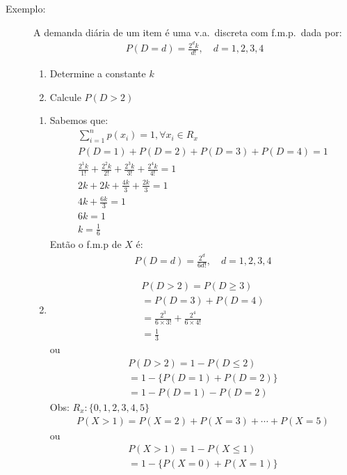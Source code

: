 \begin{description}
     \item [Exemplo:] A demanda diária de um item é uma v.a.\ discreta com f.m.p.\ dada por: 
       \begin{align}
         P(D=d)=\frac{2^d k}{d!},\quad d=1,2,3,4
       \end{align}
       \begin{enumerate}[label=(\alph*)]
         \item Determine a constante $k$
         \item Calcule $P(D>2)$
       \end{enumerate}
       \begin{enumerate}[label=(\alph*)]
         \item Sabemos que: 
           \begin{align*}
             \sum \limits^{n}_{i=1} p(x_i)=1, \forall x_i \in R_{x}\\
             P(D=1)+P(D=2)+P(D=3)+P(D=4)=1\\
             \frac{2^1 k}{1!}+\frac{2^2 k}{2!}+\frac{2^3 k}{3!}+\frac{2^4 k}{4!}=1\\
             2k + 2k+ \frac{4k}{3}+\frac{2k}{3}=1 \\
             4k+\frac{6k}{3}=1 \\
             6k=1\\
             k=\frac{1}{6}
           \end{align*}
           Então o f.m.p de $X$ é: 
           \begin{align*}
             P(D=d)=\frac{2^d}{6d!},\quad d=1,2,3,4
           \end{align*}
         \item 
           \begin{align*}
             P(D>2)=P(D \geq 3) \\
             =P(D=3)+P(D=4)\\
             =\frac{2^3}{6\times 3!}+ \frac{2^4}{6\times 4!}\\
             =\frac{1}{3}
           \end{align*}
           ou 
           \begin{align*}
             P(D>2)=1-P(D\le 2)\\
             = 1- \{ P(D=1)+ P(D=2) \}\\
             = 1- P(D=1)- P(D=2)
           \end{align*}
           Obs: $R_{x}: \{0,1,2,3,4,5 \}$
           \begin{align*}
             P(X>1)=P(X=2)+ P(X=3)+\cdots+P(X=5)
           \end{align*}
           ou
           \begin{align*}
             P(X>1)= 1-P(X\le 1)\\
             = 1- \{ P(X=0)+ P(X=1) \}
           \end{align*}
       \end{enumerate}
   \end{description}
